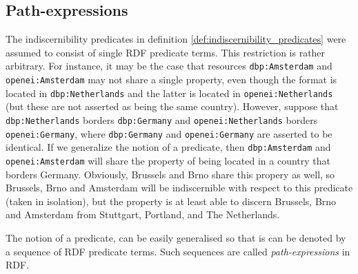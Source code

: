 \subsection{Path-expressions}
\label{sec:path_expressions}

The indiscernibility predicates in
  definition \ref{def:indiscernibility_predicates}
  were assumed to consist of single RDF predicate terms.
This restriction is rather arbitrary.
For instance,
  it may be the case that resources {\small \texttt{dbp:Amsterdam}}
  and {\small \texttt{openei:Amsterdam}} may not share a single property,
  even though the format is located in {\small \texttt{dbp:Netherlands}}
  and the latter is located in {\small \texttt{openei:Netherlands}}
  (but these are not asserted as being the same country).
However, suppose that {\small \texttt{dbp:Netherlands}}
  borders {\small \texttt{dbp:Germany}}
  and {\small \texttt{openei:Netherlands}}
  borders {\small \texttt{openei:Germany}},
  where {\small \texttt{dbp:Germany}} and
  {\small \texttt{openei:Germany}} are asserted to be identical.
If we generalize the notion of a predicate,
  then {\small \texttt{dbp:Amsterdam}} and
  {\small \texttt{openei:Amsterdam}} will share the property
  of being located in a country that borders Germany.
Obviously, Brussels and Brno share this propery as well,
  so Brussels, Brno and Amsterdam will be indiscernible with respect to
  this predicate (taken in isolation), but the property is at least
  able to discern Brussels, Brno and Amsterdam from
  Stuttgart, Portland, and The Netherlands.

The notion of a predicate, can be easily generalised
  so that is can be denoted by a sequence of RDF predicate terms.
Such sequences are called \emph{path-expressions} in RDF. 

